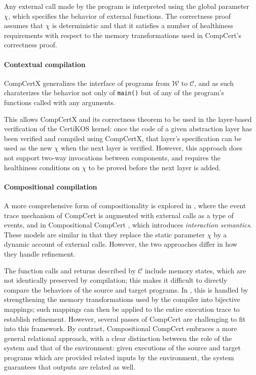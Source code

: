 \documentclass[sigplan,10pt,review,anonymous]{acmart}
\begin{document}
Any external call made by the program
is interpreted using the global parameter $\chi$,
which specifies the behavior of external functions.
The correctness proof assumes that $\chi$ is deterministic
and that it satisfies a number of healthiness requirements
with respect to the memory transformations
used in CompCert's correctness proof.


\paragraph{Contextual compilation} %

CompCertX \cite{popl15} generalizes
the interface of programs
from $\mathcal{W}$ to $\mathcal{C}$,
and as such charaterizes the behavior
not only of \texttt{main()}
but of any of the program's functions
called with any arguments.

This allows CompCertX and its correctness theorem
to be used in the layer-based verification of
the CertiKOS kernel:
once the code of a given abstraction layer has been verified
and compiled using CompCertX,
that layer's specification can be used as the new $\chi$
when the next layer is verified.
However,
this approach does not support two-way invocations between components,
and requires the healthiness conditions on $\chi$
to be proved before the next layer is added.


\paragraph{Compositional compilation} %

A more comprehensive form of compositionality
is explored in \cite{cpp15},
where the event trace mechanism of CompCert
is augmented with external calls as a type of events,
and in Compositional CompCert \cite{compcompcert},
which introduces \emph{interaction semantics}.
These models are similar in that they replace
the static parameter $\chi$
by a dynamic account of external calls.
However, the two approaches differ in
how they handle refinement.

The function calls and returns described by $\mathcal{C}$
include memory states,
which are not identically preserved by compilation;
this makes it difficult to directly compare the behaviors
of the source and target programs.
In \cite{cpp15},
this is handled by strengthening the memory transformations
used by the compiler into bijective mappings;
such mappings can then be applied to the entire execution trace
to establish refinement.
However, several passes of CompCert are challenging
to fit into this framework.
By contrast,
Compositional CompCert
embraces a more general relational approach,
with a clear distinction between the role of the system
and that of the environment:
given executions of the source and target programs
which are provided related inputs by the environment,
the system guarantees that outputs are related as well.
\end{document}
